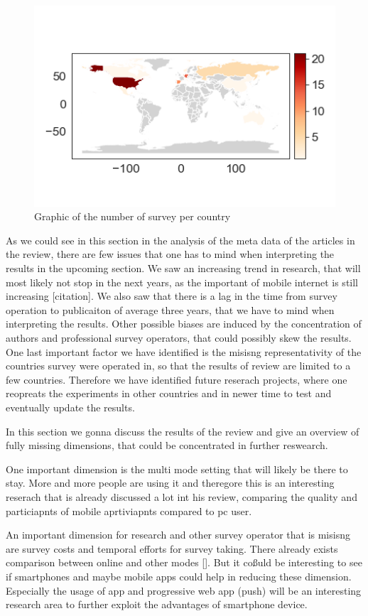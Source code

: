 \begin{figure}
    \centering
    \includegraphics[width=\textwidth]{reports/figures/surveys_per_country.png}
     \caption{Graphic of the number of survey per country}
    \label{fig: surveys_per_country}
\end{figure}


As we could see in this section in the analysis of the meta data of the articles in the review, there are few issues that one has to mind when interpreting the results in the upcoming section. We saw an increasing trend in research, that will most likely not stop in the next years, as the important of mobile internet is still increasing [citation]. We also saw that there is a lag in the time from survey operation to publicaiton of average three years, that we have to mind when interpreting the results. Other possible biases are induced by the concentration of authors and professional survey operators, that could possibly skew the results. One last important factor we have identified is the misisng representativity of the countries survey were operated in, so that the results of review are limited to a few countries. Therefore we have identified future reserach projects, where one reopreats the experiments in other countries and in newer time to test and eventually update the results. 


In this section we gonna discuss the results of the review and give an overview of fully missing dimensions, that could be concentrated in further reswearch.

One important dimension is the  multi mode setting that will likely be there to stay. More and more people are using it and theregore this is an interesting reserach that is already discussed a lot int his review, comparing the quality and particiapnts of mobile aprtiviapnts compared to pc user.

An important dimension for research and other survey operator that is misisng are survey costs and temporal efforts for survey taking. There already exists comparison between online and other modes []. But it coßuld be interesting to see if smartphones and maybe mobile apps could help in reducing these dimension. Especially the usage of app and progressive web app (push) will be an interesting research area to further exploit the advantages of smartphone device. 






